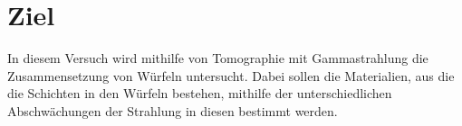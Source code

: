 \section{Ziel}
\label{sec:Ziel}

In diesem Versuch wird mithilfe von Tomographie mit Gammastrahlung die Zusammensetzung von Würfeln untersucht. Dabei sollen die Materialien, aus die die Schichten in den Würfeln bestehen, mithilfe der unterschiedlichen Abschwächungen der Strahlung in diesen bestimmt werden.
